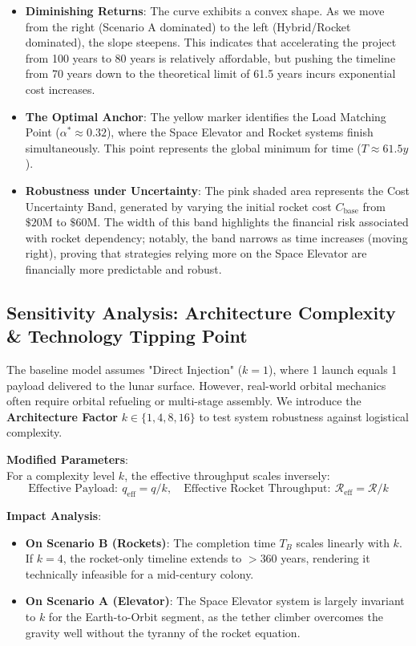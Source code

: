 \documentclass[11pt,letterpaper]{article}
\begin{document}
\begin{itemize}
    \item \noindent \textbf{Diminishing Returns}: The curve exhibits a convex shape. As we move from the right (Scenario A dominated) to the left (Hybrid/Rocket dominated), the slope steepens. This indicates that accelerating the project from 100 years to 80 years is relatively affordable, but pushing the timeline from 70 years down to the theoretical limit of 61.5 years incurs exponential cost increases.

    \item\noindent \textbf{The Optimal Anchor}: The yellow marker identifies the Load Matching Point ($\alpha^* \approx 0.32$), where the Space Elevator and Rocket systems finish simultaneously. This point represents the global minimum for time ($T \approx 61.5y$).

    \item\noindent \textbf{Robustness under Uncertainty}: The pink shaded area represents the Cost Uncertainty Band, generated by varying the initial rocket cost $C_{\text{base}}$ from $\$20\text{M}$ to $\$60\text{M}$. The width of this band highlights the financial risk associated with rocket dependency; notably, the band narrows as time increases (moving right), proving that strategies relying more on the Space Elevator are financially more predictable and robust.
\end{itemize}



\subsection{Sensitivity Analysis: Architecture Complexity \& Technology Tipping Point}

The baseline model assumes "Direct Injection" ($k=1$), where 1 launch equals 1 payload delivered to the lunar surface. However, real-world orbital mechanics often require orbital refueling or multi-stage assembly. We introduce the \textbf{Architecture Factor} $k \in \{1, 4, 8, 16\}$ to test system robustness against logistical complexity.

\noindent \textbf{Modified Parameters}:\\
For a complexity level $k$, the effective throughput scales inversely:
\[
\text{Effective Payload}: \ q_{\text{eff}} = q / k, \quad \text{Effective Rocket Throughput}: \ \mathcal{R}_{\text{eff}} = \mathcal{R} / k
\]

\noindent \textbf{Impact Analysis}:
\begin{itemize}
    \item \textbf{On Scenario B (Rockets)}: The completion time $T_B$ scales linearly with $k$. If $k=4$, the rocket-only timeline extends to $>360$ years, rendering it technically infeasible for a mid-century colony.
    \item \textbf{On Scenario A (Elevator)}: The Space Elevator system is largely invariant to $k$ for the Earth-to-Orbit segment, as the tether climber overcomes the gravity well without the tyranny of the rocket equation.
\end{itemize}
\end{document}
